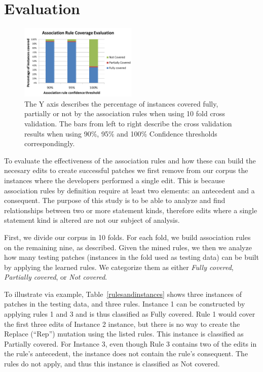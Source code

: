 \documentclass[sigconf]{acmart}
\begin{document}
\section{Evaluation}


\begin{figure}[h]
\label{ruleEval}
\caption{The Y axis describes the percentage of instances covered
fully, partially or not by the association rules when using 10 fold
cross validation. The bars from left to right describe the cross validation
results when using 90\%, 95\% and 100\% Confidence thresholds correspondingly.}
\centering
\includegraphics[width=0.5\textwidth]{images/assocRuleEval.png}
\end{figure}

To evaluate the effectiveness
of the association rules and how these can build the
necesary edits to create successful patches we first
remove from our corpus the instances where the developers
performed a single edit. This is because association rules
by definition require at least two elements: an antecedent
and a consequent. The purpose of this study is to be able to
analyze and find relationships between two or more statement
kinds, therefore edits where a single statement kind is altered
are not our subject of analysis.


First, we divide our 
corpus in 10 folds. For each fold, we build association rules on the remaining
nine, as described. Given the mined rules, we then we
analyze how many testing patches (instances in the fold used as testing data) can be
built by applying the learned rules.  We categorize them as either
\emph{Fully covered}, \emph{Partially covered}, or \emph{Not covered}.

To illustrate via example, 
Table~\ref{rulesandinstances} shows three instances of patches in the testing
data, and three rules. Instance 1 can be constructed by
applying rules 1 and 3 and is thus classified as Fully
covered. Rule 1 would cover the first three edits of Instance 2
instance, but there is no way to create the Replace (``Rep'') mutation using the
listed rules.  This instance is classified as Partially covered. For Instance 3,
even though Rule 3 
contains two of the edits in the rule's antecedent, the instance does not
contain the rule's consequent.  The rules do not apply, and thus this instance
is classified as Not covered.
\end{document}
